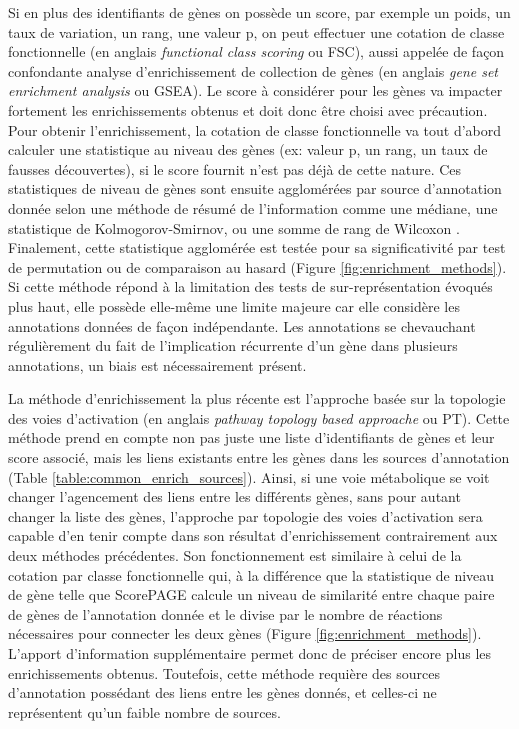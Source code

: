 Si en plus des identifiants de gènes on possède un score, par exemple un poids, un taux de variation, un rang, une valeur p, on peut effectuer une cotation de classe fonctionnelle (en anglais \textit{functional class scoring} ou FSC), aussi appelée de façon confondante analyse d'enrichissement de collection de gènes (en anglais \textit{gene set enrichment analysis} ou GSEA). Le score à considérer pour les gènes va impacter fortement les enrichissements obtenus \cite{Ackermann2009Dec} et doit donc être choisi avec précaution. Pour obtenir l'enrichissement, la cotation de classe fonctionnelle va tout d'abord calculer une statistique au niveau des gènes (ex: valeur p, un rang, un taux de fausses découvertes), si le score fournit n'est pas déjà de cette nature. Ces statistiques de niveau de gènes sont ensuite agglomérées par source d'annotation donnée selon une méthode de résumé de l'information comme une médiane, une statistique de Kolmogorov-Smirnov, ou une somme de rang de Wilcoxon \cite{Khatri2012}. Finalement, cette statistique agglomérée est testée pour sa significativité par test de permutation ou de comparaison au hasard (Figure \ref{fig:enrichment_methods}). Si cette méthode répond à la limitation des tests de sur-représentation évoqués plus haut, elle possède elle-même une limite majeure car elle considère les annotations données de façon indépendante. Les annotations se chevauchant régulièrement du fait de l'implication récurrente d'un gène dans plusieurs annotations, un biais est nécessairement présent.

La méthode d'enrichissement la plus récente est l'approche basée sur la topologie des voies d'activation (en anglais \textit{pathway topology based approache} ou PT). Cette méthode prend en compte non pas juste une liste d'identifiants de gènes et leur score associé, mais les liens existants entre les gènes dans les sources d'annotation \cite{Khatri2012} (Table \ref{table:common_enrich_sources}). Ainsi, si une voie métabolique se voit changer l'agencement des liens entre les différents gènes, sans pour autant changer la liste des gènes, l'approche par topologie des voies d'activation sera capable d'en tenir compte dans son résultat d'enrichissement contrairement aux deux méthodes précédentes. Son fonctionnement est similaire à celui de la cotation par classe fonctionnelle qui, à la différence que la statistique de niveau de gène telle que ScorePAGE \cite{Rahnenfuhrer2004Jun} calcule un niveau de similarité entre chaque paire de gènes de l'annotation donnée et le divise par le nombre de réactions nécessaires pour connecter les deux gènes (Figure \ref{fig:enrichment_methods}). L'apport d'information supplémentaire permet donc de préciser encore plus les enrichissements obtenus. Toutefois, cette méthode requière des sources d'annotation possédant des liens entre les gènes donnés, et celles-ci ne représentent qu'un faible nombre de sources.

